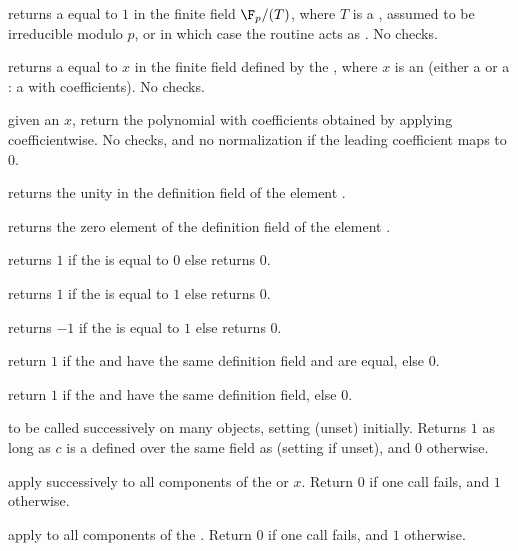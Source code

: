  returns a  equal to $1$ in the
finite field $\F_p/(T)$, where $T$ is a , assumed to be irreducible
modulo $p$, or  in which case the routine acts as .
No checks.

 returns a  equal to $x$
in the finite field defined by the  , where
$x$ is an  (either a  or a : a  with
 coefficients). No checks.

 given an  $x$,
return the polynomial with  coefficients obtained by
applying  coefficientwise. No checks, and no normalization
if the leading coefficient maps to $0$.

 returns the unity in the definition field of the
 element .

 returns the zero element of the definition field of
the  element .

 returns $1$ if the   is equal
to $0$ else returns $0$.

 returns $1$ if the   is equal
to $1$ else returns $0$.

 returns $-1$ if the   is equal
to $1$ else returns $0$.

 return $1$ if the   and
 have the same definition field and are equal, else $0$.

 return $1$ if the   and
 have the same definition field, else $0$.

 to be called successively on many objects,
setting  (unset) initially. Returns $1$ as long as $c$ is a
 defined over the same field as  (setting 
if unset), and $0$ otherwise.

 apply  successively to all
components of the  or  $x$. Return $0$ if one call fails,
and $1$ otherwise.

 apply  to all components
of the . Return $0$ if one call fails, and $1$ otherwise.


